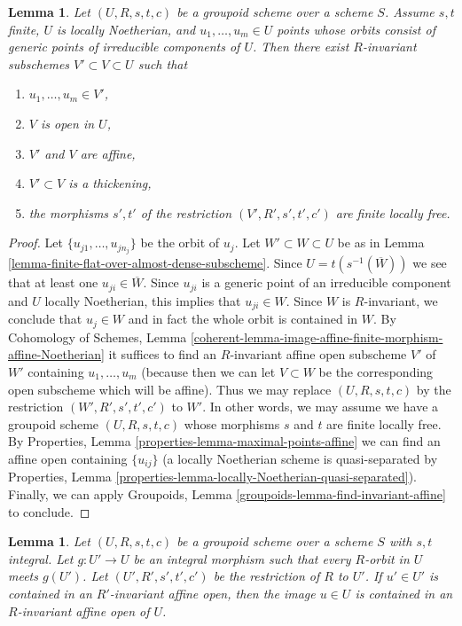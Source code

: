\documentclass[10pt,a4paper]{amsart}
\theoremstyle{plain}
\newtheorem{lemma}[subsection]{Lemma}
\theoremstyle{definition}
\theoremstyle{remark}
\numberwithin{equation}{subsection}
\begin{document}
\begin{lemma}
\label{lemma-invariant-affine-open-around-generic-point-Noetherian}
Let $(U, R, s, t, c)$ be a groupoid scheme over a scheme $S$.
Assume $s, t$ finite, $U$ is locally Noetherian, and $u_1, \ldots, u_m \in U$
points whose orbits consist of generic points of irreducible
components of $U$. Then there exist $R$-invariant subschemes
$V' \subset V \subset U$ such that
\begin{enumerate}
\item $u_1, \ldots, u_m \in V'$,
\item $V$ is open in $U$,
\item $V'$ and $V$ are affine,
\item $V' \subset V$ is a thickening,
\item the morphisms $s', t'$ of the restriction $(V', R', s', t', c')$
are finite locally free.
\end{enumerate}
\end{lemma}

\begin{proof}
Let $\{u_{j1}, \ldots, u_{jn_j}\}$ be the orbit of $u_j$.
Let $W' \subset W \subset U$ be as in
Lemma \ref{lemma-finite-flat-over-almost-dense-subscheme}.
Since $U = t(s^{-1}(\overline{W}))$ we see that at least
one $u_{ji} \in \overline{W}$. Since $u_{ji}$ is a generic point
of an irreducible component and $U$ locally Noetherian,
this implies that $u_{ji} \in W$. Since $W$ is $R$-invariant, we
conclude that $u_j \in W$ and in fact the whole orbit is contained in $W$.
By Cohomology of Schemes, Lemma
\ref{coherent-lemma-image-affine-finite-morphism-affine-Noetherian}
it suffices to find an $R$-invariant affine open subscheme $V'$
of $W'$ containing $u_1, \ldots, u_m$ (because then we can let $V \subset W$
be the corresponding open subscheme which will be affine).
Thus we may replace $(U, R, s, t, c)$
by the restriction $(W', R', s', t', c')$ to $W'$.
In other words, we may assume we have a groupoid scheme $(U, R, s, t, c)$
whose morphisms $s$ and $t$ are finite locally free.
By Properties, Lemma \ref{properties-lemma-maximal-points-affine}
we can find an affine open containing $\{u_{ij}\}$
(a locally Noetherian scheme is quasi-separated by
Properties, Lemma \ref{properties-lemma-locally-Noetherian-quasi-separated}).
Finally, we can apply
Groupoids, Lemma \ref{groupoids-lemma-find-invariant-affine}
to conclude.
\end{proof}

\begin{lemma}
\label{lemma-find-affine-integral}
Let $(U, R, s, t, c)$ be a groupoid scheme over a scheme $S$
with $s, t$ integral. Let $g : U' \to U$ be an integral morphism
such that every $R$-orbit in $U$ meets $g(U')$. Let $(U', R', s', t', c')$
be the restriction of $R$ to $U'$. If $u' \in U'$ is contained in an
$R'$-invariant affine open, then the image $u \in U$ is contained
in an $R$-invariant affine open of $U$.
\end{lemma}
\end{document}
